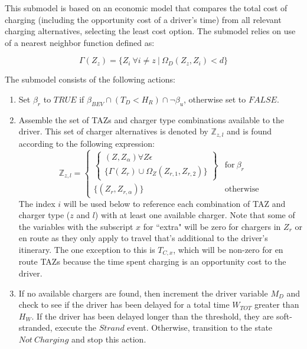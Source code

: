 \documentclass[journal]{IEEEtran}
\begin{document}
This submodel is based on an economic model that compares the total cost of charging (including the opportunity cost of a driver's time) from all relevant charging alternatives, selecting the least cost option. The submodel relies on use of a nearest neighbor function defined as:

\begin{equation}
  \Gamma(Z_z) = \{Z_i ~ \forall {i \ne z} ~ | ~ \Omega_D(Z_z,Z_i) < d\}
\end{equation}

The submodel consists of the following actions:
\begin{enumerate}[label=(\alph*)]
  \item Set $\beta_r$ to $TRUE$ if $\beta_{BEV} \cap (T_D < H_R) \cap \neg \beta_u$, otherwise set to $FALSE$.
  \item Assemble the set of TAZs and charger type combinations available to the driver. This set of charger alternatives is denoted by $\mathbb{Z}_{z,l}$ and is found according to the following expression: 
    \begin{equation}
      \mathbb{Z}_{z,l} = 
      \begin{cases}  
	\left\{ \substack{ (Z,Z_{\alpha}) \forall Z \epsilon \\ \{ \Gamma(Z_r) \cup \Omega_Z(Z_{r,1},Z_{r,2}) \}}
\right\} & \text{for}~ \beta_r \\
	\{(Z_r,Z_{r,\alpha})\} & \text{otherwise}
      \end{cases}
    \end{equation}
    The index $i$ will be used below to reference each combination of TAZ and charger type ($z$ and $l$) with at least one available charger.  Note that some of the variables with the subscript $x$ for ``extra" will be zero for chargers in $Z_r$ or en route as they only apply to travel that's additional to the driver's itinerary.  The one exception to this is $T_{C,x}$, which will be non-zero for en route TAZs because the time spent charging is an opportunity cost to the driver.

  \item If no available chargers are found, then increment the driver variable $M_D$ and check to see if the driver has been delayed for a total time $W_{TOT}$ greater than $H_W$.  If the driver has been delayed longer than the threshold, they are soft-stranded, execute the $Strand$ event.  Otherwise, transition to the state $Not ~Charging$ and stop this action.


\end{enumerate}
\end{document}
